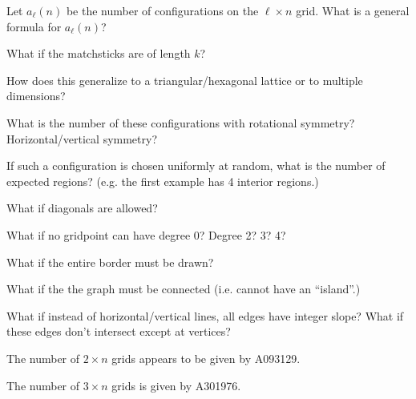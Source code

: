 \documentclass{article}
\begin{document}
\begin{question}
  Let $a_\ell(n)$ be the number of configurations on the $\ell \times n$ grid.
  What is a general formula for $a_\ell(n)$?
\end{question}

\begin{related}
  \item What if the matchsticks are of length $k$?
  \item How does this generalize to a triangular/hexagonal lattice or to
    multiple dimensions?
  \item What is the number of these configurations with rotational symmetry?
    Horizontal/vertical symmetry?
  \item If such a configuration is chosen uniformly at random, what is the
    number of expected regions? (e.g. the first example has 4 interior
    regions.)
  \item What if diagonals are allowed?
  \item What if no gridpoint can have degree 0? Degree 2? 3? 4?
  \item What if the entire border must be drawn?
  \item What if the the graph must be connected (i.e. cannot have an ``island''.)
  \item What if instead of horizontal/vertical lines, all edges have integer
    slope? What if these edges don't intersect except at vertices?
\end{related}
\begin{references}
  \item The number of $2 \times n$ grids appears to be given by A093129.
  \item The number of $3 \times n$ grids is given by A301976.
\end{references}
\end{document}

